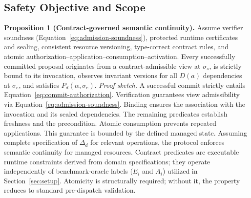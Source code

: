 \subsection{Safety Objective and Scope}
\noindent\textbf{Proposition 1 (Contract-governed semantic continuity).}
Assume verifier soundness (Equation~\eqref{eq:admission-soundness}), protected runtime certificates and sealing, consistent resource versioning, type-correct contract rules, and atomic authorization--application--consumption--activation. Every successfully committed proposal originates from a contract-admissible view at $\sigma_s$, is strictly bound to its invocation, observes invariant versions for all $D(a)$ dependencies at $\sigma_e$, and satisfies $P_d(\alpha,\sigma_e)$.
\emph{Proof sketch.} A successful commit strictly entails Equation~\eqref{eq:commit-authorization}. Verification guarantees view admissibility via Equation~\eqref{eq:admission-soundness}. Binding ensures the association with the invocation and its sealed dependencies. The remaining predicates establish freshness and the precondition. Atomic consumption prevents repeated applications.
This guarantee is bounded by the defined managed state. Assuming complete specification of $\Delta_d$ for relevant operations, the protocol enforces semantic continuity for managed resources. Contract predicates are executable runtime constraints derived from domain specifications; they operate independently of benchmark-oracle labels ($E_i$ and $A_i$) utilized in Section~\ref{sec:setup}. Atomicity is structurally required; without it, the property reduces to standard pre-dispatch validation.
